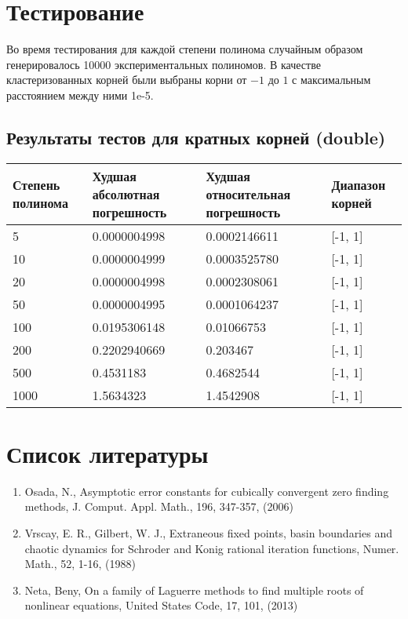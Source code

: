 \documentclass[a4paper,12pt]{article}
\begin{document}
\newpage
\section{Тестирование}
Во время тестирования для каждой степени полинома случайным образом генерировалось 10000 экспериментальных полиномов. В качестве кластеризованных корней были выбраны корни от $-1$ до $1$ с максимальным расстоянием между ними 1e-5.
\subsection{Результаты тестов для кратных корней (double)}
\begin{center}
  \begin{tabular}{|p{3.5cm}|p{5.0cm}|p{5.0cm}|p{2.5cm}|}
  \hline
  \textbf{Степень полинома} & \textbf{Худшая абсолютная погрешность} & \textbf{Худшая относительная погрешность} & \textbf{Диапазон корней} \\
  \hline
  5 & 0.0000004998 & 0.0002146611 & [-1, 1] \\
  \hline
  10 & 0.0000004999 & 0.0003525780 & [-1, 1]\\
  \hline
  20 & 0.0000004998 & 0.0002308061 & [-1, 1]\\
  \hline
  50 & 0.0000004995 & 0.0001064237 & [-1, 1]\\
  \hline
  100 & 0.0195306148 & 0.01066753 & [-1, 1]\\
  \hline
  200 & 0.2202940669 & 0.203467 & [-1, 1]\\
  \hline
  500 & 0.4531183 & 0.4682544 & [-1, 1]\\
  \hline
  1000 & 1.5634323 & 1.4542908 & [-1, 1]\\
  \hline
\end{tabular}
\label{tab:my_label_2}
\end{center}


\newpage

\section{Список литературы}
\begin{enumerate}
    \item Osada, N., Asymptotic error constants for cubically convergent zero finding methods, J. Comput. Appl. Math., 196, 347-357, (2006)
    \item Vrscay, E. R., Gilbert, W. J., Extraneous fixed points, basin boundaries and chaotic dynamics for Schroder and Konig rational iteration functions, Numer. Math., 52, 1-16, (1988)
    \item Neta, Beny, On a family of Laguerre methods to find multiple roots of nonlinear equations, United States Code, 17, 101, (2013)
\end{enumerate}
\end{document}
